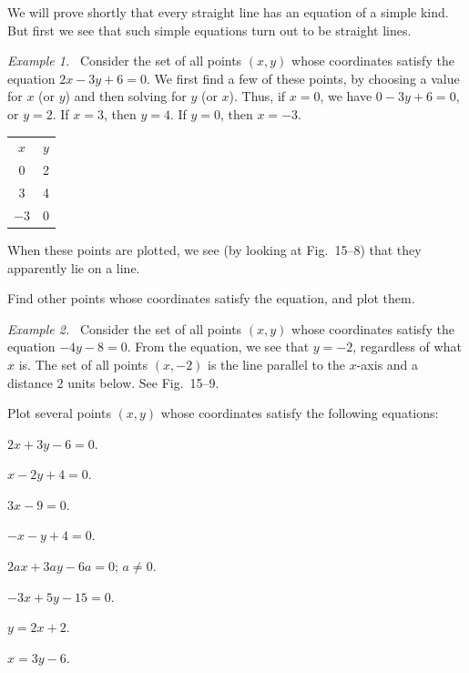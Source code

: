 \documentclass[11pt]{book}
\theoremstyle{bkplain}
\newenvironment{XVexample}[1][]{\par\medskip\noindent\emph{Example#1.}\ }{\par\medskip}
\begin{document}
We will prove shortly that every straight line has an equation of a simple
kind. But first we see that such simple equations turn out to be straight
lines.

\begin{XVexample}[ 1]
Consider the set of all points $(x, y)$ whose coordinates satisfy the equation
$2x - 3y + 6 = 0$. We first find a few of these points, by choosing a value
for $x$ (or $y$) and then solving for $y$ (or $x$). Thus, if $x = 0$, we have
$0 - 3y + 6 = 0$, or $y = 2$. If $x = 3$, then $y = 4$. If $y = 0$, then
$x = -3$.
\par\medskip
\begin{center}
\begin{tabular}{c|c}
\multicolumn{1}{c}{$x$} & \multicolumn{1}{c}{$y$} \\
0 & 2 \\
3 & 4 \\
$-3$ & 0 \\
\end{tabular}
\end{center}
\end{XVexample}

\FIGXVEIGHTNINE

When these points are plotted, we see (by looking at Fig.~15--8) that they
apparently lie on a line.

Find other points whose coordinates satisfy the equation, and plot them.

\begin{XVexample}[ 2]
Consider the set of all points $(x, y)$ whose coordinates satisfy the equation
$-4y - 8 = 0$. From the equation, we see that $y = -2$, regardless of what $x$
is. The set of all points $(x, -2)$ is the line parallel to the $x$-axis and a
distance 2 units below. See Fig.~15--9.
\end{XVexample}

Plot several points $(x, y)$ whose coordinates satisfy the following
equations:
\begin{exercisecols}
\begin{exlist}
\item $2x + 3y - 6 = 0$.
\item $x - 2y + 4 = 0$.
\item $3x - 9 = 0$.
\item $-x - y + 4 = 0$.
\item $2ax + 3ay - 6a = 0$; $a \neq 0$.
\item $-3x + 5y - 15 = 0$.
\item $y = 2x + 2$.
\item $x = 3y - 6$.
\end{exlist}
\end{exercisecols}
\end{document}
